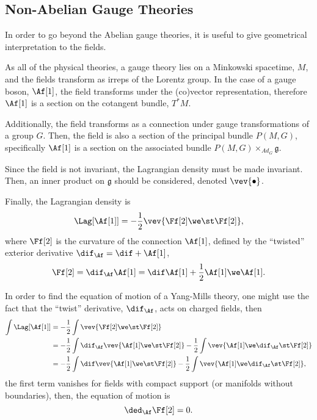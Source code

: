 \subsection{Non-Abelian Gauge Theories}

In order to go beyond the Abelian gauge theories, it is useful to give geometrical interpretation to the fields.

As all of the physical theories, a gauge theory lies on a Minkowski spacetime, $M$, and the fields transform as irreps of the Lorentz group. In the case of a gauge boson,  $\Af[1]$, the field transforms under the (co)vector representation, therefore $\Af[1]$ is a section on the cotangent bundle, $T^*M$.

Additionally, the field transforms as a connection under gauge transformations of a group $G$. Then, the field is also a section of the principal bundle $P(M,G)$, specifically $\Af[1]$ is a section on the associated bundle $P(M,G) \times_{Ad_G} \mathfrak{g}$.

Since the field is not invariant, the Lagrangian density must be made invariant. Then, an inner product on $\mathfrak{g}$ should be considered, denoted $\vev{\bullet}$.

Finally, the Lagrangian density is
\begin{equation}
  \Lag[\Af[1]] = -\frac{1}{2} \vev{ \Ff[2] \we \st \Ff[2] },
\end{equation}
where $\Ff[2]$ is the curvature of the connection $\Af[1]$, defined by the ``twisted'' exterior derivative $\dif_{\Af}= \dif + \Af[1]$,
\begin{equation}
  \Ff[2] = \dif_{\Af} \Af[1] = \dif\Af[1] + \frac{1}{2} \Af[1] \we \Af[1].
\end{equation}


\begin{WEbox}[%
    frametitle={Equations of Motion for Yang-Mills Theories},
    frametitlerule=true,
    frametitlealignment=\centering,
    frametitleaboveskip=10pt,]
  In order to find the equation of motion of a Yang-Mills theory, one might use the fact that the ``twist'' derivative, $\dif_{\Af}$, acts on charged fields, then
  \begin{align*}
    \int \Lag[\Af[1]]
    &= -\frac{1}{2} \int \vev{ \Ff[2]\we \st \Ff[2] } \\
    &= -\frac{1}{2} \int \dif_{\Af} \vev{ \Af[1] \we \st \Ff[2] } - \frac{1}{2}\int \vev{ \Af[1] \we \dif_{\Af} \st \Ff[2] } \\
    &= -\frac{1}{2} \int \dif \vev{ \Af[1] \we \st \Ff[2] } - \frac{1}{2} \int \vev{ \Af[1] \we \dif_{\Af} \st \Ff[2] },
  \end{align*}
  the first term vanishes for fields with compact support (or manifolds without boundaries), then, the equation of motion is 
  \begin{equation*}
    \ded_{\Af}\Ff[2] =0.
  \end{equation*}
\end{WEbox}





